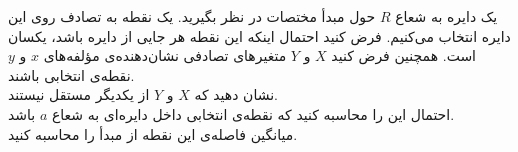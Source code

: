 \problem{}
یک دایره به شعاع \( R \) حول مبدأ مختصات در نظر بگیرید. یک نقطه به تصادف روی این دایره انتخاب می‌کنیم. 
فرض کنید احتمال اینکه این نقطه هر جایی از دایره باشد، یکسان است. همچنین فرض کنید 
\( X \) و \( Y \) متغیرهای تصادفی نشان‌دهنده‌ی مؤلفه‌های \( x \) و \( y \) نقطه‌ی انتخابی باشند. 
\\
[5pt]
\subproblem{}
نشان دهید که \( X \) و \( Y \) از یکدیگر مستقل نیستند.
\\
\subproblem{}
احتمال این را محاسبه کنید که نقطه‌ی انتخابی داخل دایره‌ای به شعاع \( a \) باشد.
\\
\subproblem{}
میانگین فاصله‌ی این نقطه از مبدأ را محاسبه کنید.
